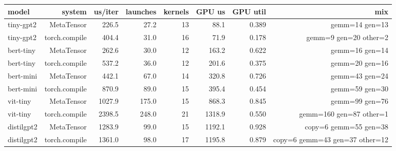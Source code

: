 \begin{tabular}{lrrrrrrr}
\toprule
model & system & us/iter & launches & kernels & GPU us & GPU util & mix \\
\midrule
tiny-gpt2 & MetaTensor & 226.5 & 27.2 & 13 & 88.1 & 0.389 & gemm=14 gen=13 \\
tiny-gpt2 & torch.compile & 404.4 & 31.0 & 16 & 71.9 & 0.178 & gemm=9 gen=20 other=2 \\
bert-tiny & MetaTensor & 262.6 & 30.0 & 12 & 163.2 & 0.622 & gemm=16 gen=14 \\
bert-tiny & torch.compile & 537.2 & 36.0 & 12 & 201.6 & 0.375 & gemm=20 gen=16 \\
bert-mini & MetaTensor & 442.1 & 67.0 & 14 & 320.8 & 0.726 & gemm=43 gen=24 \\
bert-mini & torch.compile & 870.9 & 89.0 & 15 & 395.4 & 0.454 & gemm=59 gen=30 \\
vit-tiny & MetaTensor & 1027.9 & 175.0 & 15 & 868.3 & 0.845 & gemm=99 gen=76 \\
vit-tiny & torch.compile & 2398.5 & 248.0 & 21 & 1318.9 & 0.550 & gemm=160 gen=87 other=1 \\
distilgpt2 & MetaTensor & 1283.9 & 99.0 & 15 & 1192.1 & 0.928 & copy=6 gemm=55 gen=38 \\
distilgpt2 & torch.compile & 1361.0 & 98.0 & 17 & 1195.8 & 0.879 & copy=6 gemm=43 gen=37 other=12 \\
\bottomrule
\end{tabular}
